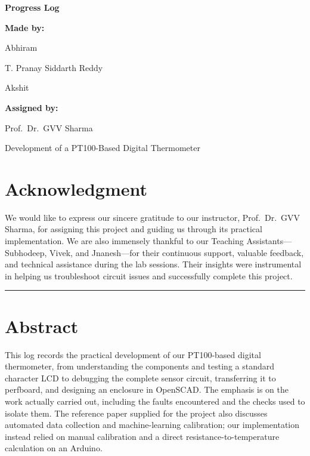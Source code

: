 \documentclass[12pt,a4paper]{article}
\begin{document}
\begin{titlepage}
    \centering
    \vspace*{1.4cm}
    {\Huge\bfseries Progress Log\par}
    \vspace{1.8cm}
    {\Large\bfseries Made by:\par}
    \vspace{0.6cm}
    {\large Abhiram\par}
    \vspace{0.25cm}
    {\large T. Pranay Siddarth Reddy\par}
    \vspace{0.25cm}
    {\large Akshit\par}
    \vspace{1.3cm}
    {\Large\bfseries Assigned by:\par}
    \vspace{0.6cm}
    {\large Prof.\ Dr.\ GVV Sharma\par}
    \vfill
    {\large Development of a PT100-Based Digital Thermometer\par}
\end{titlepage}

\tableofcontents
\clearpage

\section*{Acknowledgment}
We would like to express our sincere gratitude to our instructor,
Prof.\ Dr.\ GVV Sharma, for assigning this project and guiding us
through its practical implementation. We are also immensely thankful
to our Teaching Assistants---Subhodeep, Vivek, and Jnanesh---for their
continuous support, valuable feedback, and technical assistance during
the lab sessions. Their insights were instrumental in helping us
troubleshoot circuit issues and successfully complete this project.

\vspace{0.8cm}
\noindent\rule{\linewidth}{0.4pt}
\vspace{0.4cm}

\section*{Abstract}
This log records the practical development of our PT100-based digital
thermometer, from understanding the components and testing a standard
character LCD to debugging the complete sensor circuit, transferring it
to perfboard, and designing an enclosure in OpenSCAD. The emphasis is on
the work actually carried out, including the faults encountered and the
checks used to isolate them. The reference paper supplied for the project
also discusses automated data collection and machine-learning calibration;
our implementation instead relied on manual calibration and a direct
resistance-to-temperature calculation on an Arduino.
\end{document}
